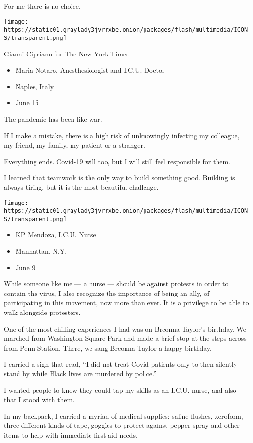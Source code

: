 For me there is no choice.

\texttt{[image: https://static01.graylady3jvrrxbe.onion/packages/flash/multimedia/ICONS/transparent.png]}

Gianni Cipriano for The New York Times

\begin{itemize}
\tightlist
\item
  Maria Notaro, Anesthesiologist and I.C.U. Doctor
\item
  Naples, Italy
\item
  June 15
\end{itemize}

The pandemic has been like war.

If I make a mistake, there is a high risk of unknowingly infecting my
colleague, my friend, my family, my patient or a stranger.

Everything ends. Covid-19 will too, but I will still feel responsible
for them.

I learned that teamwork is the only way to build something good.
Building is always tiring, but it is the most beautiful challenge.

\texttt{[image: https://static01.graylady3jvrrxbe.onion/packages/flash/multimedia/ICONS/transparent.png]}

\begin{itemize}
\tightlist
\item
  KP Mendoza, I.C.U. Nurse
\item
  Manhattan, N.Y.
\item
  June 9
\end{itemize}

While someone like me --- a nurse --- should be against protests in
order to contain the virus, I also recognize the importance of being an
ally, of participating in this movement, now more than ever. It is a
privilege to be able to walk alongside protesters.

One of the most chilling experiences I had was on Breonna Taylor's
birthday. We marched from Washington Square Park and made a brief stop
at the steps across from Penn Station. There, we sang Breonna Taylor a
happy birthday.

I carried a sign that read, ``I did not treat Covid patients only to
then silently stand by while Black lives are murdered by police.''

I wanted people to know they could tap my skills as an I.C.U. nurse, and
also that I stood with them.

In my backpack, I carried a myriad of medical supplies: saline flushes,
xeroform, three different kinds of tape, goggles to protect against
pepper spray and other items to help with immediate first aid needs.

